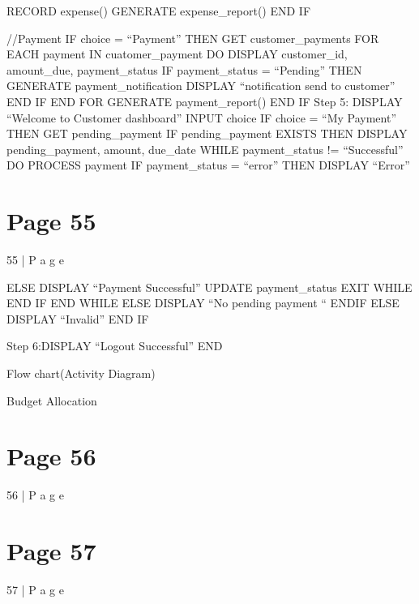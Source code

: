 \documentclass{article}
\begin{document}
   RECORD expense() 
   GENERATE expense\_report() 
  END IF 
 
  //Payment 
  IF choice = “Payment” THEN 
   GET customer\_payments 
   FOR EACH payment IN cuatomer\_payment DO 
    DISPLAY customer\_id, amount\_due, payment\_status 
    IF payment\_status = “Pending” THEN 
     GENERATE payment\_notification  
     DISPLAY “notification send to customer” 
    END IF 
   END FOR 
   GENERATE payment\_report() 
  END IF 
 Step 5: DISPLAY “Welcome to Customer dashboard” 
  INPUT choice 
  IF choice = “My Payment” THEN 
   GET pending\_payment 
   IF pending\_payment EXISTS THEN 
    DISPLAY pending\_payment, amount, due\_date 
    WHILE payment\_status != “Successful” DO 
     PROCESS payment  
     IF payment\_status = “error” THEN 
      DISPLAY “Error” 

\section*{Page 55}
55 | P a g e 
 
     ELSE 
      DISPLAY “Payment Successful” 
      UPDATE payment\_status 
      EXIT WHILE 
     END IF 
    END WHILE 
   ELSE 
    DISPLAY “No pending payment “ 
   ENDIF 
  ELSE 
   DISPLAY “Invalid” 
  END IF 
 
 Step 6:DISPLAY “Logout Successful” 
   END 
    
   
 
Flow chart(Activity Diagram) 
 
Budget Allocation  
 
 
 
   
 

\section*{Page 56}
56 | P a g e 
 
  
     
 
  
 
 
 
 
 
 
 
 
 
 
 
 
 
 
 
 
 
 
 
 
 
 


\section*{Page 57}
57 | P a g e 
 
\end{document}
